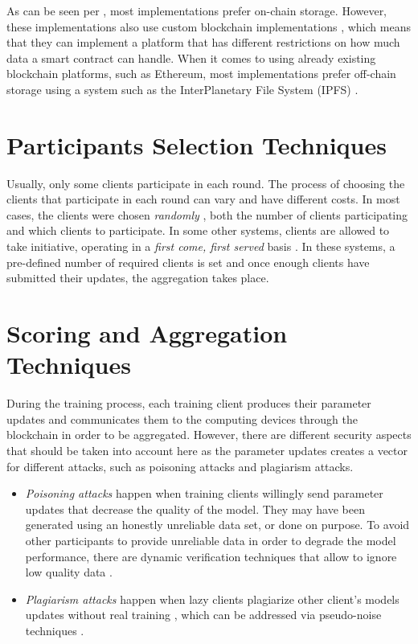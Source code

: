 As can be seen per , most implementations prefer on-chain storage. However, these implementations also use custom blockchain implementations \cite{8733825, 9524833, 8894364, 9184854, 8893114}, which means that they can implement a platform that has different restrictions on how much data a smart contract can handle. When it comes to using already existing blockchain platforms, such as Ethereum, most implementations prefer off-chain storage using a system such as the InterPlanetary File System (IPFS) \cite{10.48550/arxiv.2007.03856, 8945913, Peyvandi2022, 9170559, 10.1145/3319535.3363256, 10.48550/arxiv.2011.07516}.

\section{Participants Selection Techniques} 

Usually, only some clients participate in each round. The process of choosing the clients that participate in each round can vary and have different costs. In most cases, the clients were chosen \textit{randomly} \cite{Peyvandi2022, demo, 9293091}, both the number of clients participating and which clients to participate. In some other systems, clients are allowed to take initiative, operating in a \textit{first come, first served} basis \cite{9184854, FANG20221}. In these systems, a pre-defined number of required clients is set and once enough clients have submitted their updates, the aggregation takes place.

\section{Scoring and Aggregation Techniques}

During the training process, each training client produces their parameter updates and communicates them to the computing devices through the blockchain in order to be aggregated. However, there are different security aspects that should be taken into account here as the parameter updates creates a vector for different attacks, such as poisoning attacks and plagiarism attacks.

\begin{itemize}
    \item \textit{Poisoning attacks} happen when training clients willingly send parameter updates that decrease the quality of the model. They may have been generated using an honestly unreliable data set, or done on purpose. To avoid other participants to provide unreliable data in order to degrade the model performance, there are dynamic verification techniques that allow to ignore low quality data \cite{10.48550/arxiv.2110.02182, 10.48550/arxiv.2104.10501}.
    
    \item \textit{Plagiarism attacks} happen when lazy clients plagiarize other client's models updates without real training \cite{9403374}, which can be addressed via pseudo-noise techniques \cite{10.48550/arxiv.2009.09338}.
\end{itemize}

